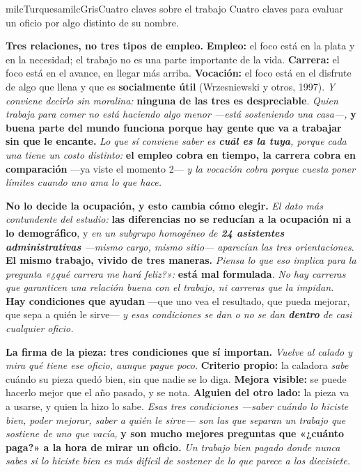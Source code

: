 \documentclass[11pt,letterpaper]{article}
\newcommand{\milcpaso}[3]{%
\Needspace{4\baselineskip}%
\begin{tcolorbox}[enhanced,colback=white,colframe=milcLinea,arc=1.5mm,boxrule=.9pt,
  left=14mm,right=4mm,top=3mm,bottom=3mm,before skip=4pt,after skip=4pt,
  fontupper=\RaggedRight,
  overlay={\node[anchor=north west,circle,fill=#2,text=white,inner sep=0pt,
    minimum size=7.4mm,font=\sffamily\bfseries\small]
    at ([xshift=3.6mm,yshift=-3.2mm]frame.north west) {#1};}]
#3
\end{tcolorbox}}
\begin{document}
\begin{softbox}{milcTurquesa}{milcGris}{Cuatro claves sobre el trabajo}
Cuatro claves para evaluar un oficio por algo distinto de su nombre.
\end{softbox}

\milcpaso{1}{milcTurquesa}{\textbf{Tres relaciones, no tres tipos de empleo.} \textbf{Empleo:} el foco está en la plata y en la necesidad; el trabajo no es una parte importante de la vida. \textbf{Carrera:} el foco está en el avance, en llegar más arriba. \textbf{Vocación:} el foco está en el disfrute de algo que llena y que es \textbf{socialmente útil} (Wrzesniewski y otros, 1997). \emph{Y conviene decirlo sin moralina:} \textbf{ninguna de las tres es despreciable}. \emph{Quien trabaja para comer no está haciendo algo menor ---está sosteniendo una casa---,} \textbf{y buena parte del mundo funciona porque hay gente que va a trabajar sin que le encante.} \emph{Lo que sí conviene saber es \textbf{cuál es la tuya}, porque cada una tiene un costo distinto:} \textbf{el empleo cobra en tiempo, la carrera cobra en comparación} ---ya viste el momento 2--- \emph{y la vocación cobra porque cuesta poner límites cuando uno ama lo que hace.}}
\milcpaso{2}{milcTurquesa}{\textbf{No lo decide la ocupación, y esto cambia cómo elegir.} \emph{El dato más contundente del estudio:} \textbf{las diferencias no se reducían a la ocupación ni a lo demográfico}, y \emph{en un subgrupo homogéneo de \textbf{24 asistentes administrativas} ---mismo cargo, mismo sitio--- aparecían las tres orientaciones}. \textbf{El mismo trabajo, vivido de tres maneras.} \emph{Piensa lo que eso implica para la pregunta «¿qué carrera me hará feliz?»:} \textbf{está mal formulada}. \emph{No hay carreras que garanticen una relación buena con el trabajo, ni carreras que la impidan.} \textbf{Hay condiciones que ayudan} ---que uno vea el resultado, que pueda mejorar, que sepa a quién le sirve--- \emph{y esas condiciones se dan o no se dan \textbf{dentro} de casi cualquier oficio.}}
\milcpaso{3}{milcTurquesa}{\textbf{La firma de la pieza: tres condiciones que sí importan.} \emph{Vuelve al calado y mira qué tiene ese oficio, aunque pague poco.} \textbf{Criterio propio:} la caladora \emph{sabe} cuándo su pieza quedó bien, sin que nadie se lo diga. \textbf{Mejora visible:} se puede hacerlo mejor que el año pasado, y se nota. \textbf{Alguien del otro lado:} la pieza va a usarse, y quien la hizo lo sabe. \emph{Esas tres condiciones ---saber cuándo lo hiciste bien, poder mejorar, saber a quién le sirve--- son las que separan un trabajo que sostiene de uno que vacía,} \textbf{y son mucho mejores preguntas que «¿cuánto paga?» a la hora de mirar un oficio.} \emph{Un trabajo bien pagado donde nunca sabes si lo hiciste bien es más difícil de sostener de lo que parece a los diecisiete.}}
\end{document}
